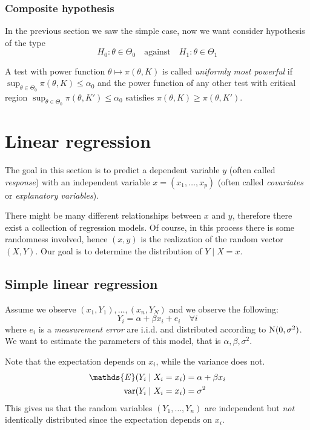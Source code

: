 \documentclass[12pt]{extarticle}
\renewcommand{\var}{{\operatorfont var}}
\newcommand{\E}{\mathds{E}}
\newcommand{\Normal}{{\operatorfont N}}
\begin{document}
\subsubsection{Composite hypothesis}
In the previous section we saw the simple case, now we want consider hypothesis of the type
\begin{equation}
    H_0: \theta \in \Theta_0 \quad \text{against} \quad H_1 : \theta \in \Theta_1
\end{equation}

A test with power function $\theta \mapsto \pi(\theta, K)$ is called \emph{uniformly most powerful}
if $\sup_{\theta \in \Theta_0} \pi(\theta, K) \leq \alpha_0$ and the power function of any other test
with critical region $\sup_{\theta \in \Theta_0} \pi(\theta, K') \leq \alpha_0$ satisfies
$\pi(\theta, K) \geq \pi(\theta, K')$.

\section{Linear regression}

The goal in this section is to predict a dependent variable $y$ (often called \emph{response})
with an independent variable $x = (x_1, \dots, x_p)$
(often called \emph{covariates} or \emph{explanatory variables}).

There might be many different relationships between $x$ and $y$,
therefore there exist a collection of regression models.
Of course, in this process there is some randomness involved, hence $(x, y)$
is the realization of the random vector $(X, Y)$.
Our goal is to determine the distribution of $Y \mid X = x$.

\subsection{Simple linear regression}
Assume we observe $(x_1, Y_1), \dots, (x_n, Y_N)$ and we observe the following:
\begin{equation}
    Y_i = \alpha + \beta x_i + e_i \quad \forall i
\end{equation}
where $e_i$ is a \emph{measurement error} are i.i.d. and distributed according to $\Normal(0, \sigma^2)$.
We want to estimate the parameters of this model, that is $\alpha, \beta, \sigma^2$.

Note that the expectation depends on $x_i$, while the variance does not.
\begin{align}
    \E(Y_i \mid X_i = x_i)   & = \alpha + \beta x_i \\
    \var(Y_i \mid X_i = x_i) & = \sigma^2
\end{align}
This gives us that the random variables $(Y_1, \dots, Y_n)$ are independent
but \emph{not} identically distributed since the expectation depends on $x_i$.
\end{document}
